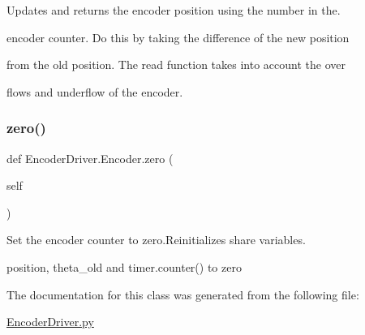 Updates and returns the encoder position using the number in the. 

encoder counter. Do this by taking the difference of the new position

from the old position. The read function takes into account the over

flows and underflow of the encoder. \mbox{\label{classEncoderDriver_1_1Encoder_a6aafe0d52333d0d1facf1e79747c96db}} 
\subsubsection{\texorpdfstring{zero()}{zero()}}
{\footnotesize\ttfamily def Encoder\+Driver.\+Encoder.\+zero (\begin{DoxyParamCaption}\item[{}]{self }\end{DoxyParamCaption})}



Set the encoder counter to zero.\+Reinitializes share variables. 

position, theta\+\_\+old and timer.\+counter() to zero 

The documentation for this class was generated from the following file\+:\begin{DoxyCompactItemize}
\item 
\mbox{\hyperlink{EncoderDriver_8py}{Encoder\+Driver.\+py}}\end{DoxyCompactItemize}
